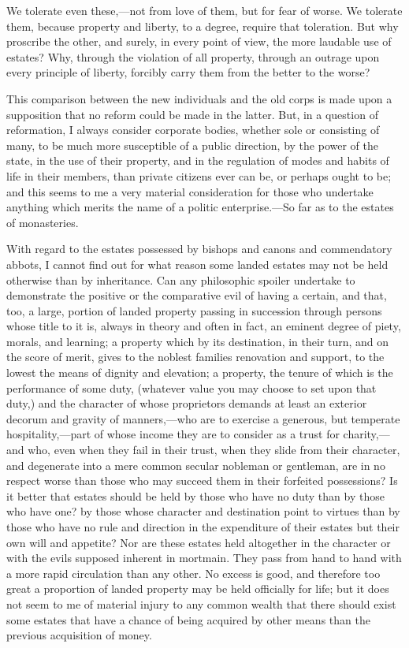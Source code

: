We tolerate even these,—not from love of them, but for fear of worse. We tolerate them, because property and liberty, to a degree, require that toleration. But why proscribe the other, and surely, in every point of view, the more laudable use of estates? Why, through the violation of all property, through an outrage upon every principle of liberty, forcibly carry them from the better to the worse?

This comparison between the new individuals and the old corps is made upon a supposition that no reform could be made in the latter. But, in a question of reformation, I always consider corporate bodies, whether sole or consisting of many, to be much more susceptible of a public direction, by the power of the state, in the use of their property, and in the regulation of modes and habits of life in their members, than private citizens ever can be, or perhaps ought to be; and this seems to me a very material consideration for those who undertake anything which merits the name of a politic enterprise.—So far as to the estates of monasteries.

With regard to the estates possessed by bishops and canons and commendatory abbots, I cannot find out for what reason some landed estates may not be held otherwise than by inheritance. Can any philosophic spoiler undertake to demonstrate the positive or the comparative evil of having a certain, and that, too, a large, portion of landed property passing in succession through persons whose title to it is, always in theory and often in fact, an eminent degree of piety, morals, and learning; a property which by its destination, in their turn, and on the score of merit, gives to the noblest families renovation and support, to the lowest the means of dignity and elevation; a property, the tenure of which is the performance of some duty, (whatever value you may choose to set upon that duty,) and the character of whose proprietors demands at least an exterior decorum and gravity of manners,—who are to exercise a generous, but temperate hospitality,—part of whose income they are to consider as a trust for charity,—and who, even when they fail in their trust, when they slide from their character, and degenerate into a mere common secular nobleman or gentleman, are in no respect worse than those who may succeed them in their forfeited possessions? Is it better that estates should be held by those who have no duty than by those who have one? by those whose character and destination point to virtues than by those who have no rule and direction in the expenditure of their estates but their own will and appetite? Nor are these estates held altogether in the character or with the evils supposed inherent in mortmain. They pass from hand to hand with a more rapid circulation than any other. No excess is good, and therefore too great a proportion of landed property may be held officially for life; but it does not seem to me of material injury to any common wealth that there should exist some estates that have a chance of being acquired by other means than the previous acquisition of money.

